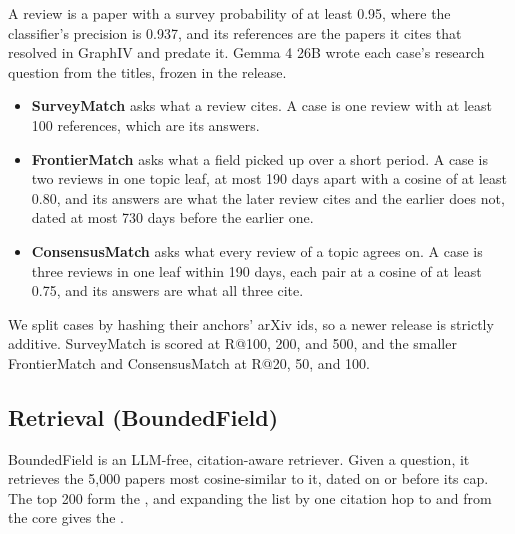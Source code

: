 A review is a paper with a survey probability of at least 0.95, where the classifier's precision is 0.937, and its references are the papers it cites that resolved in GraphIV and predate it. Gemma 4 26B wrote each case's research question from the titles, frozen in the release.

\begin{itemize}
    \item \textbf{SurveyMatch} asks what a review cites. A case is one review with at least 100 references, which are its answers.
    \item \textbf{FrontierMatch} asks what a field picked up over a short period. A case is two reviews in one topic leaf, at most 190 days apart with a cosine of at least 0.80, and its answers are what the later review cites and the earlier does not, dated at most 730 days before the earlier one.
    \item \textbf{ConsensusMatch} asks what every review of a topic agrees on. A case is three reviews in one leaf within 190 days, each pair at a cosine of at least 0.75, and its answers are what all three cite.
\end{itemize}

We split cases by hashing their anchors' arXiv ids, so a newer release is strictly additive. SurveyMatch is scored at R@100, 200, and 500, and the smaller FrontierMatch and ConsensusMatch at R@20, 50, and 100.

\subsection{Retrieval (BoundedField)}
\label{sec:bf}

BoundedField is an LLM-free, citation-aware retriever. Given a question, it retrieves the 5,000 papers most cosine-similar to it, dated on or before its cap. The top 200 form the , and expanding the list by one citation hop to and from the core gives the .

